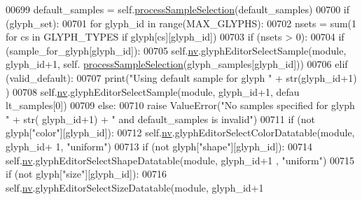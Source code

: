 \begin{DoxyCode}
00699         default\_samples = self.\hyperlink{classnavicom_1_1navicom_1_1NaviCom_a6536cf86235df90cb7443c23f11870e4}{processSampleSelection}(default\_samples)
00700         \textcolor{keywordflow}{if} (glyph\_set):
00701             \textcolor{keywordflow}{for} glyph\_id \textcolor{keywordflow}{in} range(MAX\_GLYPHS):
00702                 nsets = sum(1 \textcolor{keywordflow}{for} cs \textcolor{keywordflow}{in} GLYPH\_TYPES \textcolor{keywordflow}{if} glyph[cs][glyph\_id])
00703                 \textcolor{keywordflow}{if} (nsets > 0):
00704                     \textcolor{keywordflow}{if} (sample\_for\_glyph[glyph\_id]):
00705                         self.\hyperlink{classnavicom_1_1navicom_1_1NaviCom_af740fe52f9f3cfc076ae88ca696bd05e}{nv}.glyphEditorSelectSample(module, glyph\_id+1, self.
      \hyperlink{classnavicom_1_1navicom_1_1NaviCom_a6536cf86235df90cb7443c23f11870e4}{processSampleSelection}(glyph\_samples[glyph\_id]))
00706                     \textcolor{keywordflow}{elif} (valid\_default):
00707                         \textcolor{keywordflow}{print}(\textcolor{stringliteral}{"Using default sample for glyph "} + str(glyph\_id+1)
      )
00708                         self.\hyperlink{classnavicom_1_1navicom_1_1NaviCom_af740fe52f9f3cfc076ae88ca696bd05e}{nv}.glyphEditorSelectSample(module, glyph\_id+1, defau
      lt\_samples[0])
00709                     \textcolor{keywordflow}{else}:
00710                         \textcolor{keywordflow}{raise} ValueError(\textcolor{stringliteral}{"No samples specified for glyph "} + str(
      glyph\_id+1) + \textcolor{stringliteral}{" and default\_samples is invalid"})
00711                     \textcolor{keywordflow}{if} (\textcolor{keywordflow}{not} glyph[\textcolor{stringliteral}{"color"}][glyph\_id]):
00712                         self.\hyperlink{classnavicom_1_1navicom_1_1NaviCom_af740fe52f9f3cfc076ae88ca696bd05e}{nv}.glyphEditorSelectColorDatatable(module, glyph\_id+
      1, \textcolor{stringliteral}{"uniform"})
00713                     \textcolor{keywordflow}{if} (\textcolor{keywordflow}{not} glyph[\textcolor{stringliteral}{"shape"}][glyph\_id]):
00714                        self.\hyperlink{classnavicom_1_1navicom_1_1NaviCom_af740fe52f9f3cfc076ae88ca696bd05e}{nv}.glyphEditorSelectShapeDatatable(module, glyph\_id+1
      , \textcolor{stringliteral}{"uniform"})
00715                     \textcolor{keywordflow}{if} (\textcolor{keywordflow}{not} glyph[\textcolor{stringliteral}{"size"}][glyph\_id]):
00716                         self.\hyperlink{classnavicom_1_1navicom_1_1NaviCom_af740fe52f9f3cfc076ae88ca696bd05e}{nv}.glyphEditorSelectSizeDatatable(module, glyph\_id+1

\end{DoxyCode}
